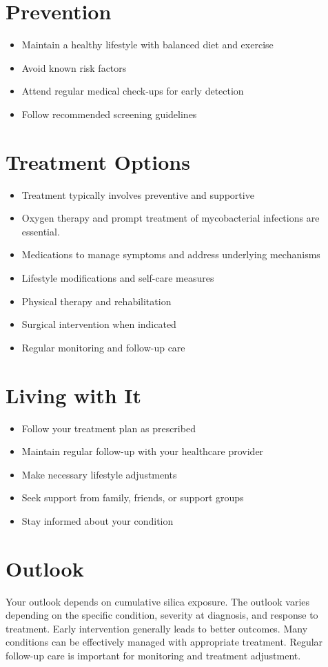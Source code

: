 \section{Prevention}
\begin{itemize}[noitemsep]
  \item Maintain a healthy lifestyle with balanced diet and exercise
  \item Avoid known risk factors
  \item Attend regular medical check-ups for early detection
  \item Follow recommended screening guidelines
\end{itemize}
\section{Treatment Options}
\begin{itemize}[noitemsep]
  \item Treatment typically involves preventive and supportive
  \item Oxygen therapy and prompt treatment of mycobacterial infections are essential.
  \item Medications to manage symptoms and address underlying mechanisms
  \item Lifestyle modifications and self-care measures
  \item Physical therapy and rehabilitation
  \item Surgical intervention when indicated
  \item Regular monitoring and follow-up care
\end{itemize}
\section{Living with It}
\begin{itemize}[noitemsep]
  \item Follow your treatment plan as prescribed
  \item Maintain regular follow-up with your healthcare provider
  \item Make necessary lifestyle adjustments
  \item Seek support from family, friends, or support groups
  \item Stay informed about your condition
\end{itemize}
\section{Outlook}
Your outlook depends on cumulative silica exposure. The outlook varies depending on the specific condition, severity at diagnosis, and response to treatment. Early intervention generally leads to better outcomes. Many conditions can be effectively managed with appropriate treatment. Regular follow-up care is important for monitoring and treatment adjustment.
